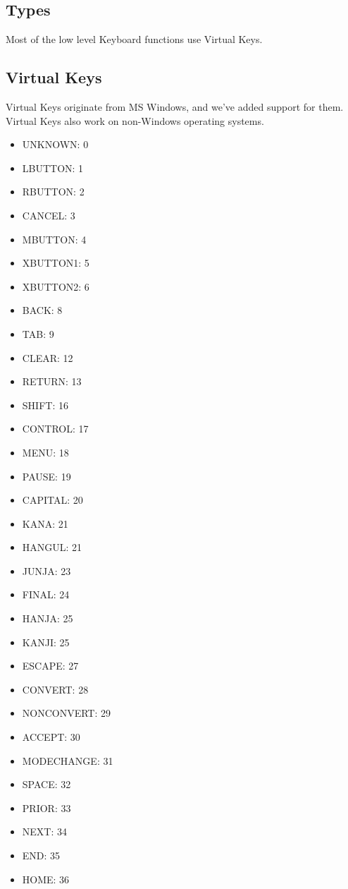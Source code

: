\documentclass[a4paper]{report}
\begin{document}
\subsection{Types}

Most of the low level Keyboard functions use Virtual Keys.

\subsection{Virtual Keys}

Virtual Keys originate from MS Windows, and we've added support for them.
Virtual Keys also work on non-Windows operating systems.

\begin{itemize}
\item   UNKNOWN: 0
\item   LBUTTON: 1
\item   RBUTTON: 2
\item   CANCEL: 3
\item   MBUTTON: 4
\item   XBUTTON1: 5
\item   XBUTTON2: 6
\item   BACK: 8
\item   TAB: 9
\item   CLEAR: 12
\item   RETURN: 13
\item   SHIFT: 16
\item   CONTROL: 17
\item   MENU: 18
\item   PAUSE: 19
\item   CAPITAL: 20
\item   KANA: 21
\item   HANGUL: 21
\item   JUNJA: 23
\item   FINAL: 24
\item   HANJA: 25
\item   KANJI: 25
\item   ESCAPE: 27
\item   CONVERT: 28
\item   NONCONVERT: 29
\item   ACCEPT: 30
\item   MODECHANGE: 31
\item   SPACE: 32
\item   PRIOR: 33
\item   NEXT: 34
\item   END: 35
\item   HOME: 36

\end{itemize}
\end{document}
